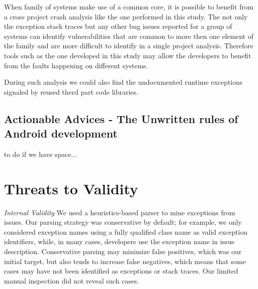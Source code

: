 \documentclass[conference]{IEEEtran}
\begin{document}
When family of systems make use of a common core, it is possible to benefit from a cross project crash analysis like the one performed in this study.
 The not only the exception stack traces but any other bug issues reported for a group of systems can identify vulnerabilities 
that are common to more then one element of the family and are more difficult to identify in a single project analysis.
Therefore tools such as the one developed in this study may allow the developers to 
benefit from the faults happening on different systems.  



During such analysis we could also find the undocumented runtime exceptions 
signaled by reused therd part code libraries. 



\subsection{Actionable Advices - The Unwritten rules of Android development}
to do if we have space...


\section{Threats to Validity}
\label{sec:threats}

\noindent\emph{Internal Validity} We used a heuristics-based parser to mine
exceptions from issues.  Our parsing strategy was conservative by default; for
example, we only considered exception names using a fully qualified class name
as valid exception identifiers, while, in many cases, developers use the
exception name in issue description. Conservative parsing may minimize false
positives, which was our initial target, but also tends to increase false
negatives, which means that some cases may have not been identified as
exceptions or stack traces. Our limited manual inspection did not reveal such
cases.
\end{document}
